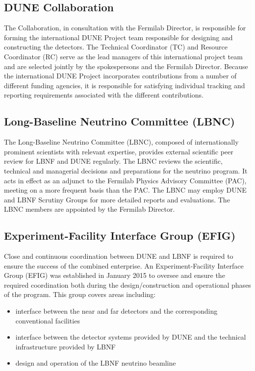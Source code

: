 \subsection{DUNE Collaboration}	

The Collaboration, in consultation with the Fermilab Director,
is responsible for forming the international DUNE Project team 
responsible for designing and constructing the detectors.  
The Technical Coordinator
(TC) and Resource Coordinator (RC) serve as the lead managers
of this international project team and are selected jointly by
the spokespersons and the Fermilab Director.  Because the international DUNE
Project incorporates contributions from a number of different
funding agencies, it 
is responsible for
satisfying individual tracking and reporting requirements associated
with 
the different contributions.

\subsection{Long-Baseline Neutrino Committee (LBNC)}

The Long-Baseline Neutrino Committee (LBNC), composed
of internationally prominent scientists with relevant expertise,
provides external scientific peer review for LBNF and DUNE  
regularly.
The LBNC reviews the scientific, technical and managerial
decisions and preparations for the neutrino program.
It acts in effect 
as an adjunct to the Fermilab Physics Advisory Committee
(PAC), meeting on a more frequent basis than the PAC.
The LBNC may employ DUNE and LBNF Scrutiny Groups for more
detailed reports and evaluations. The LBNC members are appointed by the
Fermilab Director.

\subsection{Experiment-Facility Interface Group (EFIG)}

Close and continuous coordination between DUNE and LBNF is
required to ensure the success of the combined enterprise.
An Experiment-Facility Interface Group (EFIG) was established
in January 2015 to oversee and ensure the required coordination
both during the design/construction and operational
phases of the program. This group covers areas including:
\begin{itemize}
\item  interface between the near and far detectors and the
corresponding conventional facilities
\item interface between the detector systems provided by
DUNE and the technical infrastructure provided by LBNF
\item design and operation of the LBNF neutrino beamline
\end{itemize}


